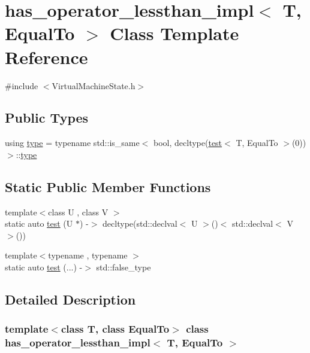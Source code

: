 \hypertarget{structhas__operator__lessthan__impl}{}\section{has\+\_\+operator\+\_\+lessthan\+\_\+impl$<$ T, Equal\+To $>$ Class Template Reference}
\label{structhas__operator__lessthan__impl}


{\ttfamily \#include $<$Virtual\+Machine\+State.\+h$>$}

\subsection*{Public Types}
\begin{DoxyCompactItemize}
\item 
using \hyperlink{structhas__operator__lessthan__impl_a94158125949ce4db0eefedbdc4cbad73}{type} = typename std\+::is\+\_\+same$<$ bool, decltype(\hyperlink{structhas__operator__lessthan__impl_a5eee8607153dcb4ac5ed91df37251062}{test}$<$ T, Equal\+To $>$(0))$>$\+::\hyperlink{structhas__operator__lessthan__impl_a94158125949ce4db0eefedbdc4cbad73}{type}
\end{DoxyCompactItemize}
\subsection*{Static Public Member Functions}
\begin{DoxyCompactItemize}
\item 
{\footnotesize template$<$class U , class V $>$ }\\static auto \hyperlink{structhas__operator__lessthan__impl_a5eee8607153dcb4ac5ed91df37251062}{test} (U $\ast$) -\/$>$ decltype(std\+::declval$<$ U $>$()$<$ std\+::declval$<$ V $>$())
\item 
{\footnotesize template$<$typename , typename $>$ }\\static auto \hyperlink{structhas__operator__lessthan__impl_ae64af96a16053f6ded781dda66fc5fb1}{test} (...) -\/$>$ std\+::false\+\_\+type
\end{DoxyCompactItemize}


\subsection{Detailed Description}
\subsubsection*{template$<$class T, class Equal\+To$>$\newline
class has\+\_\+operator\+\_\+lessthan\+\_\+impl$<$ T, Equal\+To $>$}

